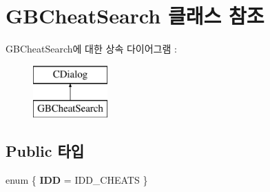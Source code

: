 \hypertarget{class_g_b_cheat_search}{}\section{G\+B\+Cheat\+Search 클래스 참조}
\label{class_g_b_cheat_search}
G\+B\+Cheat\+Search에 대한 상속 다이어그램 \+: \begin{figure}[H]
\begin{center}
\leavevmode
\includegraphics[height=2.000000cm]{class_g_b_cheat_search}
\end{center}
\end{figure}
\subsection*{Public 타입}
\begin{DoxyCompactItemize}
\item 
\mbox{\label{class_g_b_cheat_search_a8a05654b6ab7a791118b280a11c2bee4}} 
enum \{ {\bfseries I\+DD} = I\+D\+D\+\_\+\+C\+H\+E\+A\+TS
 \}
\end{DoxyCompactItemize}
